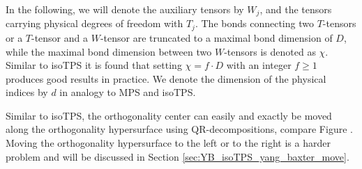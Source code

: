 In the following, we will denote the auxiliary tensors by $W_j$, and the tensors carrying physical degrees of freedom with $T_j$. The bonds connecting two $T$-tensors or a $T$-tensor and a $W$-tensor are truncated to a maximal bond dimension of $D$, while the maximal bond dimension between two $W$-tensors is denoted as $\chi$. Similar to isoTPS it is found that setting $\chi=f\cdot D$ with an integer $f\ge1$ produces good results in practice. We denote the dimension of the physical indices by $d$ in analogy to MPS and isoTPS. \par
Similar to isoTPS, the orthogonality center can easily and exactly be moved along the orthogonality hypersurface using QR-decompositions, compare Figure . Moving the orthogonality hypersurface to the left or to the right is a harder problem and will be discussed in Section \ref{sec:YB_isoTPS_yang_baxter_move}. \par
